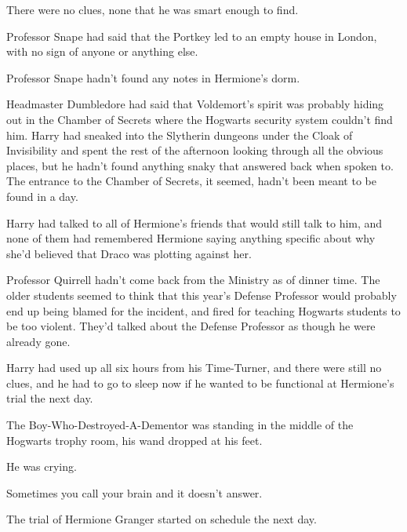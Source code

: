 There were no clues, none that he was smart enough to find.

Professor Snape had said that the Portkey led to an empty house in London, with no sign of anyone or anything else.

Professor Snape hadn't found any notes in Hermione's dorm.

Headmaster Dumbledore had said that Voldemort's spirit was probably hiding out in the Chamber of Secrets where the Hogwarts security system couldn't find him. Harry had sneaked into the Slytherin dungeons under the Cloak of Invisibility and spent the rest of the afternoon looking through all the obvious places, but he hadn't found anything snaky that answered back when spoken to. The entrance to the Chamber of Secrets, it seemed, hadn't been meant to be found in a day.

Harry had talked to all of Hermione's friends that would still talk to him, and none of them had remembered Hermione saying anything specific about why she'd believed that Draco was plotting against her.

Professor Quirrell hadn't come back from the Ministry as of dinner time. The older students seemed to think that this year's Defense Professor would probably end up being blamed for the incident, and fired for teaching Hogwarts students to be too violent. They'd talked about the Defense Professor as though he were already gone.

Harry had used up all six hours from his Time-Turner, and there were still no clues, and he had to go to sleep now if he wanted to be functional at Hermione's trial the next day.

The Boy-Who-Destroyed-A-Dementor was standing in the middle of the Hogwarts trophy room, his wand dropped at his feet.

He was crying.

Sometimes you call your brain and it doesn't answer.

The trial of Hermione Granger started on schedule the next day.


